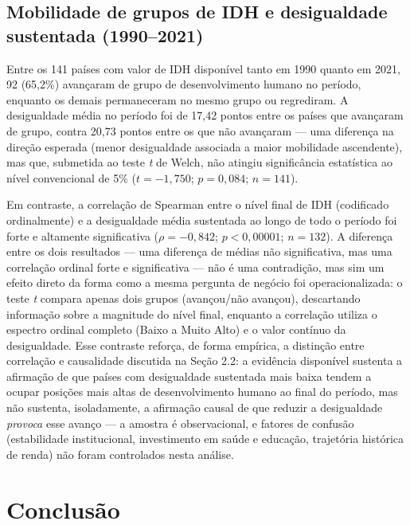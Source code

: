 \documentclass[11pt,a4paper]{article}
\begin{document}
\subsection{Mobilidade de grupos de IDH e desigualdade sustentada (1990--2021)}

Entre os 141 países com valor de IDH disponível tanto em 1990 quanto em 2021, 92 (65,2\%) avançaram de grupo de desenvolvimento humano no período, enquanto os demais permaneceram no mesmo grupo ou regrediram. A desigualdade média no período foi de 17,42 pontos entre os países que avançaram de grupo, contra 20,73 pontos entre os que não avançaram --- uma diferença na direção esperada (menor desigualdade associada a maior mobilidade ascendente), mas que, submetida ao teste \textit{t} de Welch, não atingiu significância estatística ao nível convencional de 5\% ($t=-1,750$; $p=0,084$; $n=141$).

Em contraste, a correlação de Spearman entre o nível final de IDH (codificado ordinalmente) e a desigualdade média sustentada ao longo de todo o período foi forte e altamente significativa ($\rho = -0,842$; $p < 0,00001$; $n=132$). A diferença entre os dois resultados --- uma diferença de médias não significativa, mas uma correlação ordinal forte e significativa --- não é uma contradição, mas sim um efeito direto da forma como a mesma pergunta de negócio foi operacionalizada: o teste \textit{t} compara apenas dois grupos (avançou/não avançou), descartando informação sobre a magnitude do nível final, enquanto a correlação utiliza o espectro ordinal completo (Baixo a Muito Alto) e o valor contínuo da desigualdade. Esse contraste reforça, de forma empírica, a distinção entre correlação e causalidade discutida na Seção 2.2: a evidência disponível sustenta a afirmação de que países com desigualdade sustentada mais baixa tendem a ocupar posições mais altas de desenvolvimento humano ao final do período, mas não sustenta, isoladamente, a afirmação causal de que reduzir a desigualdade \textit{provoca} esse avanço --- a amostra é observacional, e fatores de confusão (estabilidade institucional, investimento em saúde e educação, trajetória histórica de renda) não foram controlados nesta análise.

\section{Conclusão}
\end{document}
